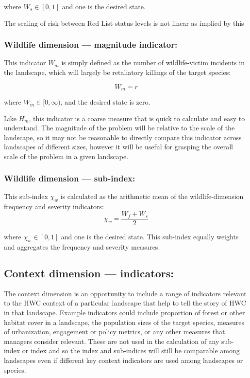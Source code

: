\documentclass[fleqn,10pt]{olplainarticle}
\begin{document}
where $W_s \in [0,1]$ and one is the desired state.

The scaling of risk between Red List status levels is not linear as implied by this 

\subsubsection*{Wildlife dimension --- magnitude indicator:}
This indicator $W_m$ is simply defined as the number of wildlife-victim incidents in the landscape, which will largely be retaliatory killings of the target species:

\begin{equation*}
    W_m = r
\end{equation*}

where $W_m \in [0,\infty)$, and the desired state is zero.

Like $H_m$, this indicator is a coarse measure that is quick to calculate and easy to understand. The magnitude of the problem will be relative to the scale of the landscape, so it may not be reasonable to directly compare this indicator across landscapes of different sizes, however it will be useful for grasping the overall scale of the problem in a given landscape.

\subsubsection*{Wildlife dimension --- sub-index:}

This sub-index $\chi_w$ is calculated as the arithmetic mean of  the wildlife-dimension frequency and severity indicators:
\begin{equation*}
    \chi_w = \frac{W_f + W_s}{2}
\end{equation*}

where $\chi_w \in [0,1]$ and one is the desired state. This sub-index equally weights and aggregates the frequency and severity measures.

\subsection*{Context dimension --- indicators:}
The context dimension is an opportunity to include a range of indicators relevant to the HWC context of a particular landscape that help to tell the story of HWC in that landscape. Example indicators could include proportion of forest or other habitat cover in a landscape, the population sizes of the target species, measures of urbanization, engagement or policy metrics, or any other measures that managers consider relevant. These are not used in the calculation of any sub-index or index and so the index and sub-indices will still be comparable among landscapes even if different key context indicators are used among landscapes or species.
\end{document}
